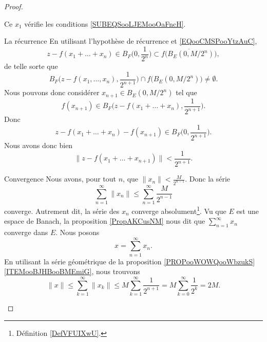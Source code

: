 \begin{proof}
\begin{subproof}
\begin{subproof}
        Ce \( x_1\) vérifie les conditions \eqref{SUBEQSooLJEMooOaFncH}.
    \item[La récurrence]
        En utilisant l'hypothèse de récurrence et \eqref{EQooCMSPooYtzAuC},
        \begin{equation}
            z-f(x_1+\ldots +x_n)\in B_F\big( 0,\frac{1}{ 2^n } \big)\subset\overline{ f\big( B_E(0,M/2^n) \big) },
        \end{equation}
        de telle sorte que
        \begin{equation}
            B_F\big( z-f(x_1,\ldots, x_n),\frac{1}{ 2^{n+1} } \big)\cap f\big( B_E(0,M/2^n) \big)\neq \emptyset.
        \end{equation}
        Nous pouvons donc considérer \( x_{n+1}\in B_E(0,M/2^n)\) tel que
        \begin{equation}
            f(x_{n+1})\in B_F\big( z-f(x_1+\ldots +x_n),\frac{1}{ 2^{n+1} } \big).
        \end{equation}
        Donc
        \begin{equation}
            z-f(x_1+\ldots +x_n)-f(x_{n+1})\in B_F\big( 0,\frac{1}{ 2^{n+1} } \big).
        \end{equation}
        Nous avons donc bien
        \begin{equation}
            \| z-f(x_1+\ldots +x_{n+1}) \|<\frac{1}{ 2^{n+1} }.
        \end{equation}
        \end{subproof}
    \item[Convergence]
        Nous avons, pour tout \( n\), que \( \| x_n \|<\frac{ M }{ 2^{n-1} }\). Donc la série
        \begin{equation}
            \sum_{n=1}^{\infty}\| x_n \|\leq \sum_{n=1}^{\infty}\frac{ M }{ 2^{n-1} }
        \end{equation}
        converge. Autrement dit, la série des \( x_n\) converge absolument\footnote{Définition \ref{DefVFUIXwU}.}. Vu que \( E\) est une espace de Banach, la proposition \ref{PropAKCusNM} nous dit que \( \sum_{n=1}^{\infty}x_n\) converge dans \( E\). Nous posons
        \begin{equation}
            x=\sum_{n=1}^{\infty}x_n.
        \end{equation}
        En utilisant la série géométrique de la proposition \ref{PROPooWOWQooWbzukS}\ref{ITEMooBJHBooBMEmiG}, nous trouvons
        \begin{equation}
            \| x \|\leq \sum_{k=1}^{\infty}\| x_k \|\leq M\sum_{k=1}^{\infty}\frac{1}{ 2^{n+1} }=M\sum_{k=0}^{\infty}\frac{1}{ 2^k }=2M.

\end{equation}
\end{subproof}
\end{proof}
